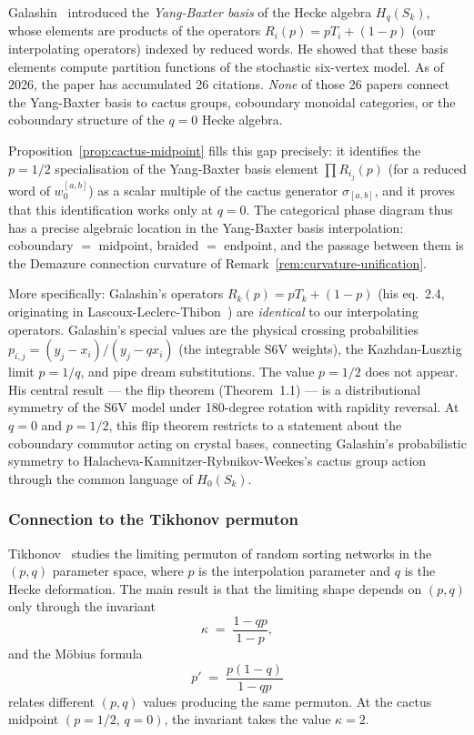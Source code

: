 \begin{remark}
\label{rem:galashin-gap}
Galashin~\cite{galashin-2020} introduced the \emph{Yang-Baxter basis} of the Hecke
algebra $H_q(S_k)$, whose elements are products of the operators $R_i(p) = pT_i + (1-p)$
(our interpolating operators) indexed by reduced words.  He showed that these basis
elements compute partition functions of the stochastic six-vertex model.  As of 2026,
the paper has accumulated 26 citations.  \emph{None} of those 26 papers connect the
Yang-Baxter basis to cactus groups, coboundary monoidal categories, or the coboundary
structure of the $q = 0$ Hecke algebra.

Proposition~\ref{prop:cactus-midpoint} fills this gap precisely: it identifies the
$p = 1/2$ specialisation of the Yang-Baxter basis element $\prod R_{i_j}(p)$ (for
a reduced word of $w_0^{[a,b]}$) as a scalar multiple of the cactus generator
$\sigma_{[a,b]}$, and it proves that this identification works only at $q = 0$.
The categorical phase diagram thus has a precise algebraic location in the Yang-Baxter
basis interpolation: coboundary $=$ midpoint, braided $=$ endpoint, and the passage
between them is the Demazure connection curvature of Remark~\ref{rem:curvature-unification}.

More specifically: Galashin's operators $R_k(p) = pT_k + (1-p)$ (his eq.~2.4,
originating in Lascoux-Leclerc-Thibon~\cite{llt-1997}) are \emph{identical} to
our interpolating operators.  Galashin's special values are the physical crossing
probabilities $p_{i,j} = (y_j - x_i)/(y_j - qx_i)$ (the integrable S6V weights),
the Kazhdan-Lusztig limit $p = 1/q$, and pipe dream substitutions.  The value
$p = 1/2$ does not appear.  His central result --- the flip theorem
(Theorem~1.1) --- is a distributional symmetry of the S6V model under 180-degree
rotation with rapidity reversal.  At $q = 0$ and $p = 1/2$, this flip theorem
restricts to a statement about the coboundary commutor acting on crystal bases,
connecting Galashin's probabilistic symmetry to Halacheva-Kamnitzer-Rybnikov-Weekes's
cactus group action through the common language of $H_0(S_k)$.
\end{remark}

\subsubsection*{Connection to the Tikhonov permuton}

Tikhonov~\cite{tikhonov-2026} studies the limiting permuton of random
sorting networks in the $(p,q)$ parameter space, where $p$ is the
interpolation parameter and $q$ is the Hecke deformation.  The
main result is that the limiting shape depends on $(p,q)$ only through
the invariant
\begin{equation}
\label{eq:tikhonov-kappa}
  \kappa \;=\; \frac{1 - qp}{1 - p},
\end{equation}
and the M\"obius formula
\begin{equation}
\label{eq:mobius}
  p' \;=\; \frac{p(1-q)}{1-qp}
\end{equation}
relates different $(p,q)$ values producing the same permuton.  At the
cactus midpoint $(p = 1/2, \, q = 0)$, the invariant takes the value
$\kappa = 2$.

